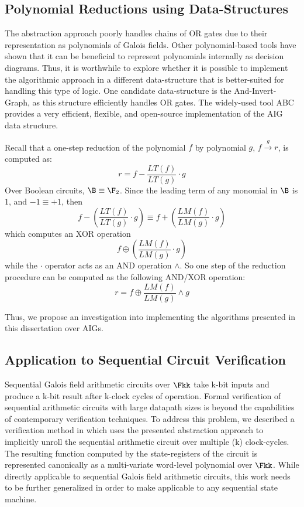 \subsection{Polynomial Reductions using Data-Structures}
The abstraction approach poorly handles chains of OR gates
due to their representation as polynomials of Galois fields.
Other polynomial-based tools \cite{polybori:2009} have shown that it 
can be beneficial to represent polynomials internally as decision diagrams.
Thus, it is worthwhile to explore whether it is possible to
implement the algorithmic approach in a different data-structure that
is better-suited for handling this type of logic.
One candidate data-structure is the And-Invert-Graph, as this structure efficiently
handles OR gates. The widely-used tool ABC\cite{abc} provides a very efficient, 
flexible, and open-source implementation of the AIG data structure.

Recall that a one-step reduction  of the polynomial $f$ by polynomial $g$, 
$f\xrightarrow{g} r$, is computed as:
\begin{equation}
r = f-\frac{LT(f)}{LT(g)}\cdot g
\end{equation}
Over Boolean circuits, $\B \equiv \F_2$. Since the leading term of
any monomial in $\B$ is $1$, and $-1\equiv +1$, then
\begin{equation}
f-(\frac{LT(f)}{LT(g)}\cdot g)\equiv f+(\frac{LM(f)}{LM(g)}\cdot g)
\end{equation}
which computes an XOR operation
\begin{equation}
f\oplus(\frac{LM(f)}{LM(g)}\cdot g)
\end{equation}
while the $\cdot$ operator acts as an AND operation $\wedge$.
So one step of the reduction procedure can be computed as the following 
AND/XOR operation:
\begin{equation}
r = f \oplus \frac{LM(f)}{LM(g)}\wedge g
\end{equation}

Thus, we propose an investigation into implementing the algorithms presented
in this dissertation over AIGs.

\subsection{Application to Sequential Circuit Verification}
Sequential Galois field arithmetic circuits over $\Fkk$
take k-bit inputs and produce a k-bit result after k-clock cycles 
of operation. Formal verification of sequential arithmetic
circuits with large datapath sizes is beyond the capabilities of
contemporary verification techniques. To address this problem,
we described a verification method in \cite{sun:date15} 
which uses the presented abstraction approach to implicitly 
unroll the sequential arithmetic circuit over multiple (k) clock-cycles.
The resulting function computed by the state-registers of the circuit 
is represented canonically as a multi-variate word-level polynomial over
$\Fkk$. While directly applicable to sequential Galois field arithmetic circuits, 
this work needs to be further generalized in order to make applicable to
any sequential state machine. 


